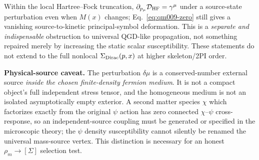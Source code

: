 \documentclass[11pt,a4paper]{article}
\begin{document}
Within the local Hartree--Fock truncation, $\partial_{p_\mu}\mathcal D_{\rm HF}=\gamma^\mu$ under a source-state perturbation even when $M(x)$ changes; Eq.~\eqref{eq:qm009-zero} still gives a vanishing source-to-kinetic principal-symbol deformation. This is a \emph{separate and indispensable} obstruction to universal QGD-like propagation, not something repaired merely by increasing the static scalar susceptibility. These statements do not extend to the full nonlocal $\Sigma_{\rm Dirac}(p,x)$ at higher skeleton/2PI order.

\textbf{Physical-source caveat.} The perturbation $\delta\mu$ is a conserved-number external source \emph{inside the chosen finite-density fermion medium}. It is not a compact object's full independent stress tensor, and the homogeneous medium is not an isolated asymptotically empty exterior. A second matter species $\chi$ which factorizes exactly from the original $\psi$ action has zero connected $\chi$--$\psi$ cross-response, so an independent-source coupling must be generated or specified in the microscopic theory; the $\psi$ density susceptibility cannot silently be renamed the universal mass-source vertex. This distinction is necessary for an honest $\rho_m\to[\Sigma]$ selection test.
\end{document}
